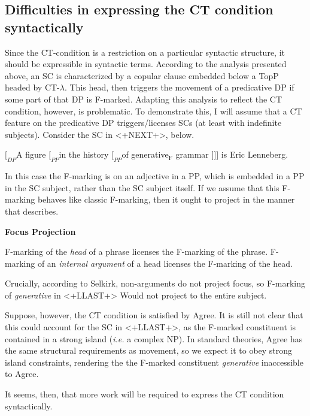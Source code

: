 \documentclass[
	letterpaper,
]{article}
\begin{document}
\subsection{Difficulties in expressing the CT condition syntactically}
Since the CT-condition is a restriction on a particular syntactic structure, it should be expressible in syntactic terms.
According to the analysis presented above, an SC is characterized by a copular clause embedded below a TopP headed by CT-$\lambda$.
This head, then triggers the movement of a predicative DP if some part of that DP is F-marked.
Adapting this analysis to reflect the CT condition, however, is problematic.
To demonstrate this, I will assume that a CT feature on the predicative DP triggers/licenses SCs (at least with indefinite subjects).
Consider the SC in <+NEXT+>, below.
\begin{exe}
	\ex $[_{DP}$A figure $[_{PP}$in the history $[_{PP}$of generative$_\text{F}$ grammar $]]]$ is Eric Lenneberg.
\end{exe}

In this case the F-marking is on an adjective in a PP, which is embedded in a PP in the SC subject, rather than the SC subject itself.
If we assume that this F-marking behaves like classic F-marking, then it ought to project in the manner that \textcite{selkirk1996sentence} describes.
\begin{exe}
	\ex \textbf{Focus Projection} \parencite{selkirk1996sentence}
	\begin{xlist}
		\ex F-marking of the \textit{head} of a phrase licenses the F-marking of the phrase.
		\ex F-marking of an \textit{internal argument} of a head licenses the F-marking of the head.		
	\end{xlist}	
\end{exe}

Crucially, according to Selkirk, non-arguments do not project focus, so F-marking of \textit{generative} in <+LLAST+> Would not project to the entire subject.

Suppose, however, the CT condition is satisfied by Agree.
It is still not clear that this could account for the SC in <+LLAST+>, as the F-marked constituent is contained in a strong island (\textit{i.e.} a complex NP).
In standard theories, Agree has the same structural requirements as movement, so we expect it to obey strong island constraints, rendering the the F-marked constituent \textit{generative} inaccessible to Agree.

It seems, then, that more work will be required to express the CT condition syntactically.
\end{document}
